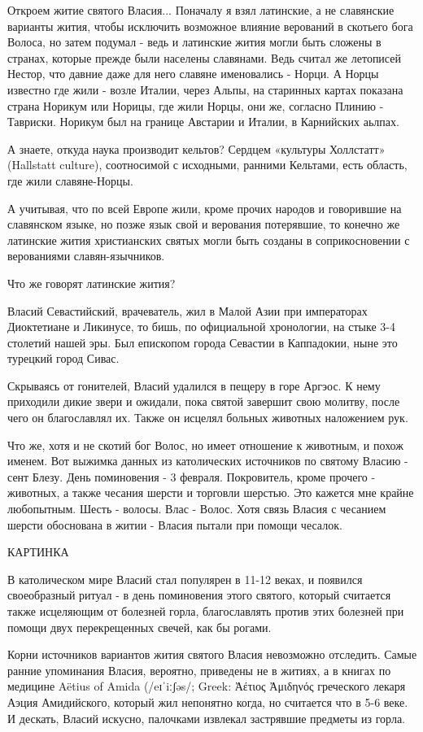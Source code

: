 \documentclass[a5paper,11pt,openany]{article}
\begin{document}
    Откроем житие святого Власия... Поначалу я взял латинские, а не славянские варианты жития, чтобы исключить возможное влияние верований в скотьего бога Волоса, но затем подумал - ведь и латинские жития могли быть сложены в странах, которые прежде были населены славянами. Ведь считал же летописей Нестор, что давние даже для него славяне именовались - Норци. А Норцы известно где жили - возле Италии, через Альпы, на старинных картах показана страна Норикум или Норицы, где жили Норцы, они же, согласно Плинию - Тавриски. Норикум был на границе Австарии и Италии, в Карнийских аьлпах. 

   А знаете, откуда наука производит кельтов? Сердцем «культуры Холлстатт» (Hallstatt
culture), соотносимой с исходными, ранними Кельтами, есть область, где жили славяне-Норцы.

   А учитывая, что по всей Европе жили, кроме прочих народов и говорившие на славянском языке, но позже язык свой и верования потерявшие, то конечно же латинские жития христианских святых могли быть созданы в соприкосновении с верованиями славян-язычников.

   Что же говорят латинские жития?

   Власий Севастийский, врачеватель, жил в Малой Азии при императорах Диоктетиане и Ликинусе, то бишь, по официальной хронологии, на стыке 3-4 столетий нашей эры. Был епископом города Севастии в Каппадокии, ныне это турецкий город Сивас. 

   Скрываясь от гонителей, Власий удалился в пещеру в горе Аргэос. К нему приходили дикие звери и ожидали, пока святой завершит свою молитву, после чего он благославлял их. Также он исцелял больных животных наложением рук.

   Что же, хотя и не скотий бог Волос, но имеет отношение к животным, и похож именем. Вот выжимка данных из католических источников по святому Власию - сент Блезу. День поминовения - 3 февраля. Покровитель, кроме прочего - животных, а также чесания шерсти и торговли шерстью. Это кажется мне крайне любопытным. Шесть - волосы. Влас - Волос. Хотя связь Власия с чесанием шерсти обоснована в житии - Власия пытали при помощи чесалок.

КАРТИНКА

   В католическом мире Власий стал популярен в 11-12 веках, и появился своеобразный ритуал - в день поминовения этого святого, который считается также исцеляющим от болезней горла, благославлять против этих болезней при помощи двух перекрещенных свечей, как бы рогами.

   Корни источников вариантов жития святого Власия невозможно отследить. Самые ранние упоминания Власия, вероятно, приведены не в житиях, а в книгах по медицине Aëtius of Amida (/eɪˈiːʃəs/; Greek: Ἀέτιος Ἀμιδηνός греческого лекаря Аэция Амидийского, который жил непонятно когда, но считается что в 5-6 веке. И дескать, Власий искусно, палочками извлекал застрявшие предметы из горла. 
\end{document}
